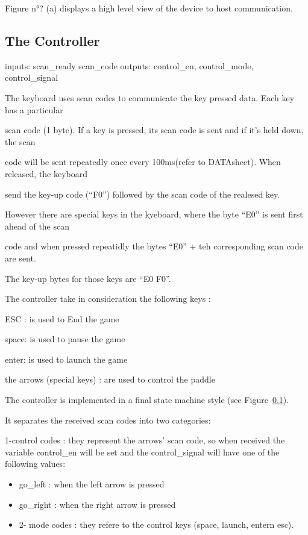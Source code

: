 \documentclass[conference]{IEEEtran}
\begin{document}
Figure n°? (a) displays a high level view of the device to host communication.


\subsection{The Controller}

inputs: scan_ready scan_code outputs: control_en, control_mode, control_signal



The keyboard uses scan codes to communicate the key pressed data. Each key has a particular

scan code (1 byte). If a key is pressed, its scan code is sent and if it's held down, the scan

code will be sent repeatedly once every 100ms(refer to DATAsheet). When released, the keyboard

send the key-up code (``F0'') followed by the scan code of the realesed key.



However there are special keys in the kyeboard, where the byte ``E0'' is sent first ahead of the scan

code and when pressed repeatidly the bytes ``E0'' + teh corresponding scan code are sent.

The key-up bytes for those keys are ``E0 F0''.



The controller take in consideration the following keys :

ESC : is used to End the game

space: is used to pause the game

enter: is used to launch the game

the arrows (special keys) : are used to control the paddle



The controller is implemented in a final state machine style (see Figure~\ref{}).

It separates the received scan codes into two categories:



1-control codes : they represent the arrows' scan code, so when received the variable control\_en will be set and the control\_signal will have one of the following values:

\begin{itemize}
\item go\_left : when the left arrow is pressed
\item go\_right : when the right arrow is pressed
\item 2- mode codes : they refere to the control keys (space, launch, entern esc).
\end{itemize}
\end{document}
